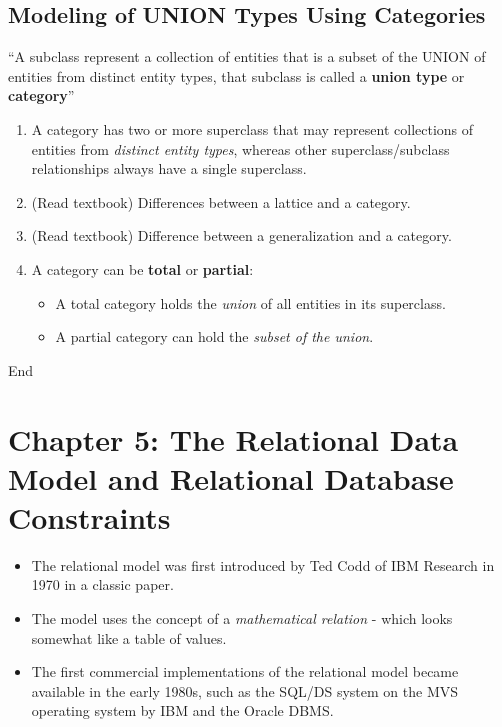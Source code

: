 \documentclass[10pt]{article}
\newcommand{\quotes}[1]{``#1''}
\begin{document}
\subsection{Modeling of UNION Types Using Categories}

\quotes{A subclass represent a collection of entities that is a subset of the UNION of entities from distinct entity types, that subclass is called a \textbf{union type} or \textbf{category}}

\begin{enumerate}
	\item A category has two or more superclass that may represent collections of entities from \textit{distinct entity types}, whereas other superclass/subclass relationships always have a single superclass.
	\item (Read textbook) Differences between a lattice and a category.
	\item (Read textbook) Difference between a generalization and a category.
	\item A category can be \textbf{total} or \textbf{partial}:
	\begin{itemize}
		\item A total category holds the \textit{union} of all entities in its superclass.
		\item A partial category can hold the \textit{subset of the union}.
	\end{itemize}
\end{enumerate}

\begin{center}
	End
\end{center}
\pagebreak


\section*{Chapter 5: The Relational Data Model and Relational Database Constraints}

\begin{itemize}
	\item The relational model was first introduced by Ted Codd of IBM Research in 1970 in a classic paper.
	\item The model uses the concept of a \textit{mathematical relation} - which looks somewhat like a table of values.
	\item The first commercial implementations of the relational model became available in the early 1980s, such as the SQL/DS system on the MVS operating system by IBM and the Oracle DBMS. 
\end{itemize}
\end{document}
